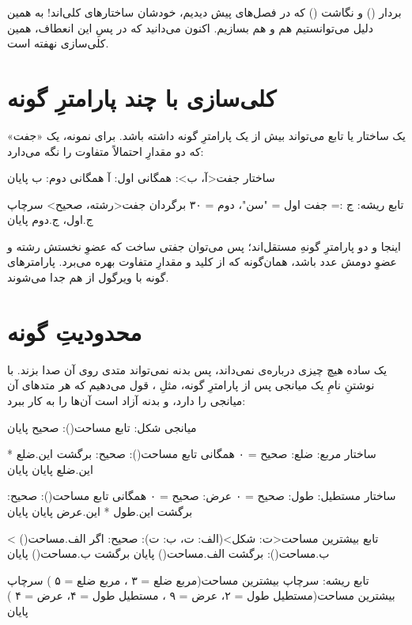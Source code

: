 \begin{tip}
بردار () و نگاشت () که در فصل‌های پیش دیدیم،
خودشان ساختارهای کلی‌اند! به همین دلیل می‌توانستیم هم  و هم
 بسازیم. اکنون می‌دانید که در پسِ این انعطاف، همین کلی‌سازی
نهفته است.
\end{tip}

\section{کلی‌سازی با چند پارامترِ گونه}

یک ساختار یا تابع می‌تواند بیش از یک پارامترِ گونه داشته باشد. برای نمونه، یک
«جفت» که دو مقدارِ احتمالاً متفاوت را نگه می‌دارد:

\begin{salamfa}
ساختار جفت<آ، ب>:
    همگانی اول: آ
    همگانی دوم: ب
پایان

تابع ریشه:
    ج := جفت { اول = "سن"، دوم = ۳۰ } برگردان جفت<رشته، صحیح>
    سرچاپ ج.اول، ج.دوم
پایان
\end{salamfa}

اینجا  و  دو پارامترِ گونهِ مستقل‌اند؛ پس می‌توان جفتی ساخت که
عضوِ نخستش رشته و عضوِ دومش عدد باشد، همان‌گونه که  از کلید و
مقدارِ متفاوت بهره می‌برد. پارامترهای گونه با ویرگول از هم جدا می‌شوند.

\section{محدودیتِ گونه}

یک  ساده هیچ چیزی درباره‌ی  نمی‌داند، پس بدنه نمی‌تواند متدی
روی آن صدا بزند. با نوشتنِ نامِ یک میانجی پس از پارامترِ گونه، مثلِ
، قول می‌دهیم که هر  متدهای آن میانجی را دارد، و بدنه آزاد
است آن‌ها را به کار ببرد:

\begin{salamfa}
میانجی شکل:
    تابع مساحت(): صحیح
پایان

ساختار مربع:
    ضلع: صحیح = ۰
    همگانی تابع مساحت(): صحیح: برگشت این.ضلع * این.ضلع پایان
پایان

ساختار مستطیل:
    طول: صحیح = ۰
    عرض: صحیح = ۰
    همگانی تابع مساحت(): صحیح: برگشت این.طول * این.عرض پایان
پایان

تابع بیشترین مساحت<ت: شکل>(الف: ت، ب: ت): صحیح:
    اگر الف.مساحت() > ب.مساحت():
        برگشت الف.مساحت()
    پایان
    برگشت ب.مساحت()
پایان

تابع ریشه:
    سرچاپ بیشترین مساحت(مربع { ضلع = ۳ }، مربع { ضلع = ۵ })
    سرچاپ بیشترین مساحت(مستطیل { طول = ۲، عرض = ۹ }، مستطیل { طول = ۴، عرض = ۴ })
پایان
\end{salamfa}

